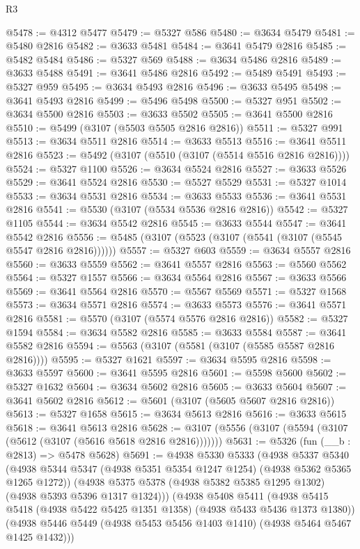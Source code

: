 \begin{lexlean}{R3}
\begin{coremodule}
@5478 := @4312 @5477
@5479 := @5327 @586
@5480 := @3634 @5479
@5481 := @5480 @2816
@5482 := @3633 @5481
@5484 := @3641 @5479 @2816
@5485 := @5482 @5484
@5486 := @5327 @569
@5488 := @3634 @5486 @2816
@5489 := @3633 @5488
@5491 := @3641 @5486 @2816
@5492 := @5489 @5491
@5493 := @5327 @959
@5495 := @3634 @5493 @2816
@5496 := @3633 @5495
@5498 := @3641 @5493 @2816
@5499 := @5496 @5498
@5500 := @5327 @951
@5502 := @3634 @5500 @2816
@5503 := @3633 @5502
@5505 := @3641 @5500 @2816
@5510 := @5499 (@3107 (@5503 @5505 @2816 @2816))
@5511 := @5327 @991
@5513 := @3634 @5511 @2816
@5514 := @3633 @5513
@5516 := @3641 @5511 @2816
@5523 := @5492 (@3107 (@5510 (@3107 (@5514 @5516 @2816 @2816))))
@5524 := @5327 @1100
@5526 := @3634 @5524 @2816
@5527 := @3633 @5526
@5529 := @3641 @5524 @2816
@5530 := @5527 @5529
@5531 := @5327 @1014
@5533 := @3634 @5531 @2816
@5534 := @3633 @5533
@5536 := @3641 @5531 @2816
@5541 := @5530 (@3107 (@5534 @5536 @2816 @2816))
@5542 := @5327 @1105
@5544 := @3634 @5542 @2816
@5545 := @3633 @5544
@5547 := @3641 @5542 @2816
@5556 := @5485 (@3107 (@5523 (@3107 (@5541 (@3107 (@5545 @5547 @2816 @2816))))))
@5557 := @5327 @603
@5559 := @3634 @5557 @2816
@5560 := @3633 @5559
@5562 := @3641 @5557 @2816
@5563 := @5560 @5562
@5564 := @5327 @1557
@5566 := @3634 @5564 @2816
@5567 := @3633 @5566
@5569 := @3641 @5564 @2816
@5570 := @5567 @5569
@5571 := @5327 @1568
@5573 := @3634 @5571 @2816
@5574 := @3633 @5573
@5576 := @3641 @5571 @2816
@5581 := @5570 (@3107 (@5574 @5576 @2816 @2816))
@5582 := @5327 @1594
@5584 := @3634 @5582 @2816
@5585 := @3633 @5584
@5587 := @3641 @5582 @2816
@5594 := @5563 (@3107 (@5581 (@3107 (@5585 @5587 @2816 @2816))))
@5595 := @5327 @1621
@5597 := @3634 @5595 @2816
@5598 := @3633 @5597
@5600 := @3641 @5595 @2816
@5601 := @5598 @5600
@5602 := @5327 @1632
@5604 := @3634 @5602 @2816
@5605 := @3633 @5604
@5607 := @3641 @5602 @2816
@5612 := @5601 (@3107 (@5605 @5607 @2816 @2816))
@5613 := @5327 @1658
@5615 := @3634 @5613 @2816
@5616 := @3633 @5615
@5618 := @3641 @5613 @2816
@5628 := @3107 (@5556 (@3107 (@5594 (@3107 (@5612 (@3107 (@5616 @5618 @2816 @2816)))))))
@5631 := @5326 (fun (__b : @2813) => @5478 @5628)
@5691 := @4938
    @5330
    @5333
    (@4938
      @5337
      @5340
      (@4938 @5344 @5347 (@4938 @5351 @5354 @1247 @1254) (@4938 @5362 @5365 @1265 @1272))
      (@4938 @5375 @5378 (@4938 @5382 @5385 @1295 @1302) (@4938 @5393 @5396 @1317 @1324)))
    (@4938
      @5408
      @5411
      (@4938 @5415 @5418 (@4938 @5422 @5425 @1351 @1358) (@4938 @5433 @5436 @1373 @1380))
      (@4938 @5446 @5449 (@4938 @5453 @5456 @1403 @1410) (@4938 @5464 @5467 @1425 @1432)))

\end{coremodule}
\end{lexlean}
